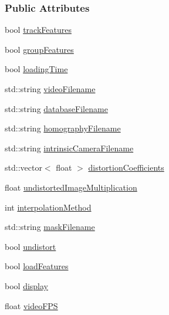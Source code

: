 \subsubsection*{Public Attributes}
\begin{DoxyCompactItemize}
\item 
bool \hyperlink{structKLTFeatureTrackingParameters_a2f9e1e592d223893da0a10a918041478}{track\-Features}
\item 
bool \hyperlink{structKLTFeatureTrackingParameters_ae6be9a8b6eef4c1e0a2628f1c245eb91}{group\-Features}
\item 
bool \hyperlink{structKLTFeatureTrackingParameters_ad8e4778a92dc382ad832c32034c166cb}{loading\-Time}
\item 
std\-::string \hyperlink{structKLTFeatureTrackingParameters_a87b8566bf24da095bacc06392f05076d}{video\-Filename}
\item 
std\-::string \hyperlink{structKLTFeatureTrackingParameters_ab3e88594375e51a2a1df46e3a43fe059}{database\-Filename}
\item 
std\-::string \hyperlink{structKLTFeatureTrackingParameters_acf597dff26e9c6ca5baa54ccf1aca168}{homography\-Filename}
\item 
std\-::string \hyperlink{structKLTFeatureTrackingParameters_a42414b788b278cc5c82ae56138629244}{intrinsic\-Camera\-Filename}
\item 
std\-::vector$<$ float $>$ \hyperlink{structKLTFeatureTrackingParameters_a669fd53774f24cb51afdd226c4cbe4fc}{distortion\-Coefficients}
\item 
float \hyperlink{structKLTFeatureTrackingParameters_ac22e64f140b123564df5f1d07dcd59bb}{undistorted\-Image\-Multiplication}
\item 
int \hyperlink{structKLTFeatureTrackingParameters_a94e4b6d4684854aec07e22e76e08bbf9}{interpolation\-Method}
\item 
std\-::string \hyperlink{structKLTFeatureTrackingParameters_aa32f95fc8ca3200bde536122aaad01d3}{mask\-Filename}
\item 
bool \hyperlink{structKLTFeatureTrackingParameters_aab76e7ff65dedfb16d14dc4c17d50611}{undistort}
\item 
bool \hyperlink{structKLTFeatureTrackingParameters_a9c8bb8bc271d18ef336bb4cc87dfa62e}{load\-Features}
\item 
bool \hyperlink{structKLTFeatureTrackingParameters_a2751a5a7daba84d0ec5595ead46cfd2b}{display}
\item 
float \hyperlink{structKLTFeatureTrackingParameters_aaa2efb4d7c7c2a9899501b8978278db5}{video\-F\-P\-S}

\end{DoxyCompactItemize}
